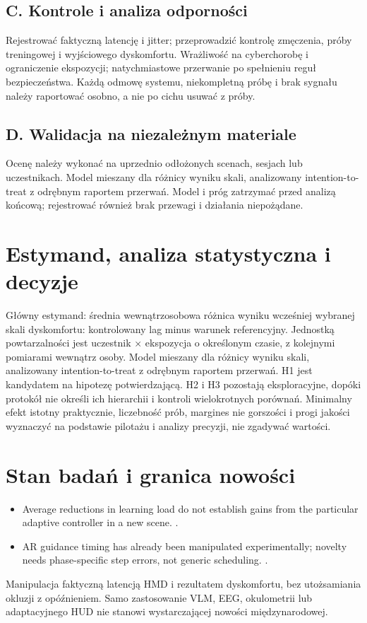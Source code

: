 \documentclass[11pt,a4paper]{article}
\begin{document}
\subsection{C. Kontrole i analiza odporności}
Rejestrować faktyczną latencję i jitter; przeprowadzić kontrolę zmęczenia, próby treningowej i wyjściowego dyskomfortu. Wrażliwość na cyberchorobę i ograniczenie ekspozycji; natychmiastowe przerwanie po spełnieniu reguł bezpieczeństwa. Każdą odmowę systemu, niekompletną próbę i brak sygnału należy raportować osobno, a nie po cichu usuwać z próby.

\subsection{D. Walidacja na niezależnym materiale}
Ocenę należy wykonać na uprzednio odłożonych scenach, sesjach lub uczestnikach. Model mieszany dla różnicy wyniku skali, analizowany intention-to-treat z odrębnym raportem przerwań. Model i próg zatrzymać przed analizą końcową; rejestrować również brak przewagi i działania niepożądane.

\section{Estymand, analiza statystyczna i decyzje}
Główny estymand: średnia wewnątrzosobowa różnica wyniku wcześniej wybranej skali dyskomfortu: kontrolowany lag minus warunek referencyjny. Jednostką powtarzalności jest uczestnik × ekspozycja o określonym czasie, z kolejnymi pomiarami wewnątrz osoby. Model mieszany dla różnicy wyniku skali, analizowany intention-to-treat z odrębnym raportem przerwań. H1 jest kandydatem na hipotezę potwierdzającą. H2 i H3 pozostają eksploracyjne, dopóki protokół nie określi ich hierarchii i kontroli wielokrotnych porównań. Minimalny efekt istotny praktycznie, liczebność prób, margines nie gorszości i progi jakości wyznaczyć na podstawie pilotażu i analizy precyzji, nie zgadywać wartości.

\section{Stan badań i granica nowości}
\begin{itemize}
\item Average reductions in learning load do not establish gains from the particular adaptive controller in a new scene. \cite{xrprior1}.
\item AR guidance timing has already been manipulated experimentally; novelty needs phase-specific step errors, not generic scheduling. \cite{xrprior2}.
\end{itemize}
Manipulacja faktyczną latencją HMD i rezultatem dyskomfortu, bez utożsamiania okluzji z opóźnieniem. Samo zastosowanie VLM, EEG, okulometrii lub adaptacyjnego HUD nie stanowi wystarczającej nowości międzynarodowej.
\end{document}
